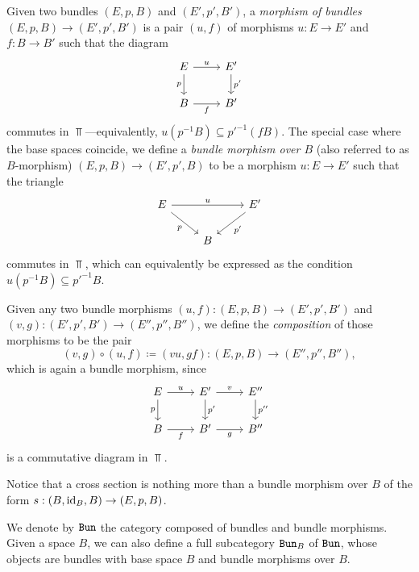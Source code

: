 \documentclass[../../../deep-dive]{subfile}
\begin{document}
\begin{definition}
    \label{def:bundle-morphism}
    Given two bundles \((E, p, B)\) and \((E', p', B')\), a \emph{morphism of
        bundles} \((E, p, B) \to (E', p', B')\) is a pair \((u, f)\) of morphisms
    \(u: E \to E'\) and \(f: B \to B'\) such that the diagram
    \[
        \begin{tikzcd}
            E \ar[r, "u"] \ar[d, "p"'] &E' \ar[d, "p'"] \\
            B \ar[r, "f"'] &B'
        \end{tikzcd}
    \]
    commutes in \(\Top\)---equivalently, \(u (p^{-1} B) \subseteq p'^{-1}(f
    B)\). The special case where the base spaces coincide, we define a \emph{bundle
        morphism over \(B\)} (also referred to as \(B\)-morphism)
    \((E, p, B) \to (E', p', B)\) to be a morphism \(u: E \to E'\) such that the
    triangle
    \[
        \begin{tikzcd}
            E \ar[rr, "u"] \ar[dr, "p"'] & &E' \ar[ld, "p'"] \\
            &B &
        \end{tikzcd}
    \]
    commutes in \(\Top\), which can equivalently be expressed as the condition
    \(u (p^{-1} B) \subseteq p'^{-1} B\).

    Given any two bundle morphisms \((u, f): (E, p, B) \to (E', p', B')\) and \((v,
    g): (E', p', B') \to (E'', p'', B'')\), we define the \emph{composition} of
    those morphisms to be the pair
    \[
        (v, g) \circ (u, f) \coloneq (v u, g f):
        (E, p, B) \longrightarrow (E'', p'', B''),
    \]
    which is again a bundle morphism, since
    \[
        \begin{tikzcd}
            E \ar[r, "u"] \ar[d, "p"']
            &E' \ar[d, "p'"] \ar[r, "v"]
            &E'' \ar[d, "p''"]
            \\
            B \ar[r, "f"']
            &B' \ar[r, "g"']
            &B''
        \end{tikzcd}
    \]
    is a commutative diagram in \(\Top\).
\end{definition}

\begin{example}
    \label{exp:cross-section-is-bundle-morphism}
    Notice that a cross section is nothing more than a bundle morphism over \(B\) of
    the form \(s: (B, \operatorname{id}_B, B) \to (E, p, B)\).
\end{example}

\begin{definition}
    \label{def:category-of-bundles}
    We denote by \({\texttt{Bun}}\) the category composed of bundles and bundle
    morphisms. Given a space \(B\), we can also define a full subcategory \({\texttt{Bun}}_B\)
    of \({\texttt{Bun}}\), whose objects are bundles with base space \(B\) and bundle
    morphisms over \(B\).
\end{definition}
\end{document}
